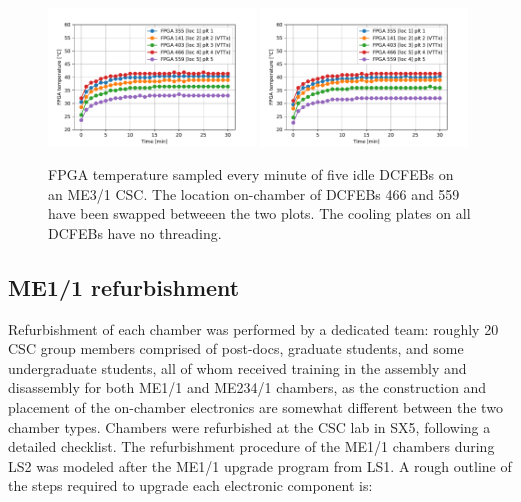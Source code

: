 \begin{figure}[H]
    \centering
    {\includegraphics[width=0.49\textwidth]{Images/Phase2Upgrades/DCFEBTempStudy/TempPlot_2019_01_17_nothread12345-5433.pdf}}
    {\includegraphics[width=0.49\textwidth]{Images/Phase2Upgrades/DCFEBTempStudy/TempPlot_2019_01_17_nothread12354-5430.pdf}}
    \caption{FPGA temperature sampled every minute of five idle DCFEBs on an ME3/1 CSC. The location on-chamber of DCFEBs 466 and 559 have been swapped betweeen the two plots. The cooling plates on all DCFEBs have no threading.}
    \label{fig:FPGAtemp2}
\end{figure}

\subsection{ME1/1 refurbishment} \label{sec:ME1/1refurbishment}

Refurbishment of each chamber was performed by a dedicated team: roughly 20 CSC group members comprised of post-docs, graduate students, and some undergraduate students, all of whom received training in the assembly and disassembly for both ME1/1 and ME234/1 chambers, as the construction and placement of the on-chamber electronics are somewhat different between the two chamber types. Chambers were refurbished at the CSC lab in SX5, following a detailed checklist. The refurbishment procedure of the ME1/1 chambers during LS2 was modeled after the ME1/1 upgrade program from LS1. A rough outline of the steps required to upgrade each electronic component is: 

